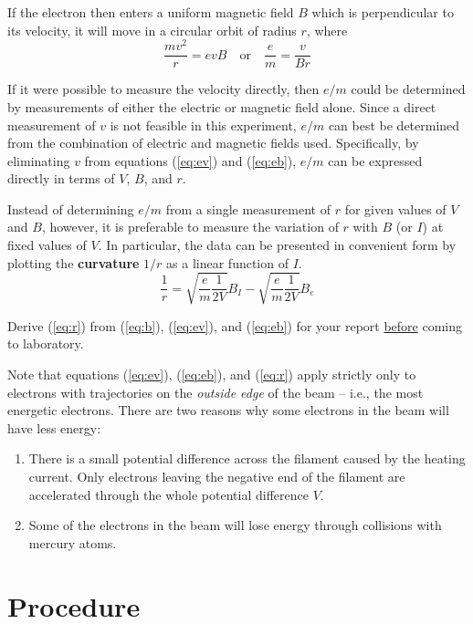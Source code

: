 If the electron then enters a uniform magnetic field $B$ which is perpendicular to its velocity, it will move in a circular orbit of radius $r$, where
\begin{equation}
  \frac{mv^2}{r}=evB\quad\mathrm{or}\quad \frac{e}{m}=\frac{v}{Br}
\label{eq:eb}
\end{equation}

If it were possible to measure the velocity directly, then $e/m$ could be determined by measurements of either the electric or magnetic field alone. Since a direct measurement of $v$ is not feasible in this experiment, $e/m$ can best be determined from the combination of electric and magnetic fields used. Specifically, by eliminating $v$ from equations ({\ref{eq:ev}}) and ({\ref{eq:eb}}), $e/m$ can be expressed directly in terms of $V$, $B$, and $r$.\myskip

Instead of determining $e/m$ from a single measurement of $r$ for given values of $V$ and $B$, however, it is preferable to measure the variation of $r$ with $B$ (or $I$) at fixed values of $V$. In particular, the data can be presented in convenient form by plotting the \textbf{curvature} $1/r$ as a linear function of $I$.
\begin{equation}
  \frac{1}{r}=\sqrt{\frac{e}{m}\frac{1}{2V}}B_{I}-\sqrt{\frac{e}{m}\frac{1}{2V}}B_{e}
\label{eq:r}
\end{equation}

Derive ({\ref{eq:r}}) from ({\ref{eq:b}}), ({\ref{eq:ev}}), and ({\ref{eq:eb}}) for your report \underline{before} coming to laboratory.\myskip

Note that equations ({\ref{eq:ev}}), ({\ref{eq:eb}}), and ({\ref{eq:r}}) apply strictly only to electrons with trajectories on the \emph{outside edge} of the beam -- i.e., the most energetic electrons. There are two reasons why some electrons in the beam will have less energy:
\begin{enumerate}
\item There is a small potential difference across the filament caused by the heating current. Only electrons leaving the negative end of the filament are accelerated through the whole potential difference $V$.
\item Some of the electrons in the beam will lose energy through collisions with mercury atoms.
\end{enumerate}

\section{Procedure}
